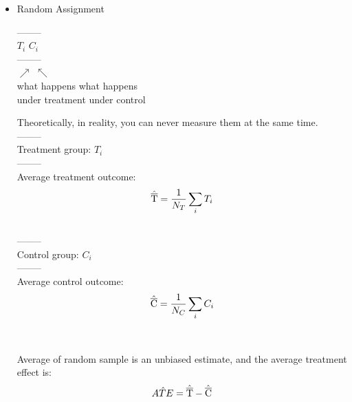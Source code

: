 

\begin{itemize}
    \item Random Assignment



\begin{center}
--------\\
$T_i$ \textbar $C_i$\\
--------\\
$\nearrow$ \hspace{1cm} $\nwarrow$\\
what happens    \hspace{1cm}      what happens\\
under treatment   \hspace{1cm}       under control\\
\end{center}

Theoretically, in reality, you can never measure them at the same time.\\

  \hspace*{3.6cm}  --------\\
Treatment group: \hspace{1cm}$T_i$ \textbar  \textbar \textbar \textbar\\
  \hspace*{3.6cm}  --------\\
Average treatment outcome: 
\begin{equation*}
    \hat{\overline{\rm T}} = \frac{1}{N_T} \sum_{i}^{} T_i
\end{equation*}
\\

  \hspace*{3.6cm}  --------\\
Control group: \hspace{1.3cm} \textbar  \textbar \textbar \textbar \textbar $C_i$\\
  \hspace*{3.6cm}  --------\\
Average control outcome: 
\begin{equation*}
    \hat{\overline{\rm C}} = \frac{1}{N_C} \sum_{i}^{} C_i
\end{equation*}
\\
  \\
Average of random sample is an unbiased estimate, and the average treatment effect is:
\begin{equation*}
    A\hat{T}E = \hat{\overline{\rm T}} - \hat{\overline{\rm C}}
\end{equation*}
\end{itemize}


